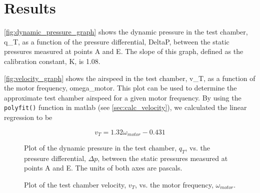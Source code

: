 \chapter{Results}
\label{cp:results}

\autoref{fig:dynamic_pressure_graph} shows the dynamic pressure in the test chamber, \gls{q_T}, as a function of the pressure differential, \gls{DeltaP}, between the static pressures measured at points A and E. The slope of this graph, defined as the calibration constant, \gls{K}, is \num{1.08}.

\autoref{fig:velocity_graph} shows the airspeed in the test chamber, \gls{v_T}, as a function of the motor frequency, \gls{omega_motor}. This plot can be used to determine the approximate test chamber airspeed for a given motor frequency. By using the \verb|polyfit()| function in \acrshort{matlab} (see \autoref{sec:calc_velocity}), we calculated the linear regression to be

\begin{equation}\label{eq:velocity_regression}
    v_T = 1.32\omega_{motor}-0.431
\end{equation}

\begin{figure}[htpb]
    \centering
    
    \caption[Plot of dynamic pressure vs. the pressure differential]{Plot of the dynamic pressure in the test chamber, $q_T$, vs. the pressure differential, $\Delta{}p$, between the static pressures measured at points A and E. The units of both axes are pascals.}
    \label{fig:dynamic_pressure_graph}
\end{figure}

\begin{figure}[htpb]
    \centering
    
    \caption[Plot of test chamber velocity vs. the motor frequency]{Plot of the test chamber velocity, $v_T$, vs. the motor frequency, $\omega_{motor}$.}
    \label{fig:velocity_graph}
\end{figure}